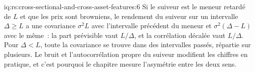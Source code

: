 \begin{solution}{iq:rs:cross-sectional-and-cross-asset-features:6}
Si le suiveur est le meneur retardé de $L$ et que les prix sont browniens, le rendement du suiveur sur un intervalle $\Delta \ge L$ a une covariance
$\sigma^2 L$ avec l'intervalle précédent du meneur et $\sigma^2(\Delta - L)$ avec le même~: la part prévisible vaut $L/\Delta$, et la
corrélation décalée vaut $L/\Delta$. Pour $\Delta < L$, toute la covariance se trouve dans des intervalles passés, répartie sur plusieurs. Le bruit et
l'autocorrélation propre du suiveur modifient les chiffres en pratique, et c'est pourquoi le chapitre mesure l'asymétrie entre les deux
sens.
\end{solution}
